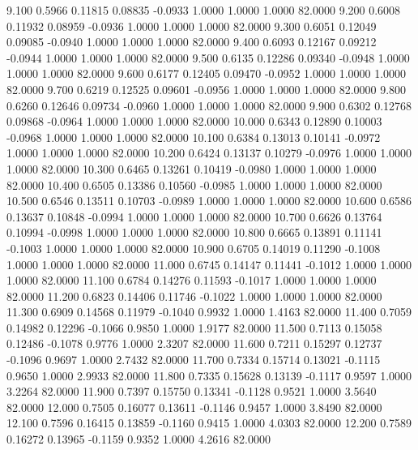    9.100   0.5966   0.11815   0.08835  -0.0933   1.0000   1.0000   1.0000  82.0000
   9.200   0.6008   0.11932   0.08959  -0.0936   1.0000   1.0000   1.0000  82.0000
   9.300   0.6051   0.12049   0.09085  -0.0940   1.0000   1.0000   1.0000  82.0000
   9.400   0.6093   0.12167   0.09212  -0.0944   1.0000   1.0000   1.0000  82.0000
   9.500   0.6135   0.12286   0.09340  -0.0948   1.0000   1.0000   1.0000  82.0000
   9.600   0.6177   0.12405   0.09470  -0.0952   1.0000   1.0000   1.0000  82.0000
   9.700   0.6219   0.12525   0.09601  -0.0956   1.0000   1.0000   1.0000  82.0000
   9.800   0.6260   0.12646   0.09734  -0.0960   1.0000   1.0000   1.0000  82.0000
   9.900   0.6302   0.12768   0.09868  -0.0964   1.0000   1.0000   1.0000  82.0000
  10.000   0.6343   0.12890   0.10003  -0.0968   1.0000   1.0000   1.0000  82.0000
  10.100   0.6384   0.13013   0.10141  -0.0972   1.0000   1.0000   1.0000  82.0000
  10.200   0.6424   0.13137   0.10279  -0.0976   1.0000   1.0000   1.0000  82.0000
  10.300   0.6465   0.13261   0.10419  -0.0980   1.0000   1.0000   1.0000  82.0000
  10.400   0.6505   0.13386   0.10560  -0.0985   1.0000   1.0000   1.0000  82.0000
  10.500   0.6546   0.13511   0.10703  -0.0989   1.0000   1.0000   1.0000  82.0000
  10.600   0.6586   0.13637   0.10848  -0.0994   1.0000   1.0000   1.0000  82.0000
  10.700   0.6626   0.13764   0.10994  -0.0998   1.0000   1.0000   1.0000  82.0000
  10.800   0.6665   0.13891   0.11141  -0.1003   1.0000   1.0000   1.0000  82.0000
  10.900   0.6705   0.14019   0.11290  -0.1008   1.0000   1.0000   1.0000  82.0000
  11.000   0.6745   0.14147   0.11441  -0.1012   1.0000   1.0000   1.0000  82.0000
  11.100   0.6784   0.14276   0.11593  -0.1017   1.0000   1.0000   1.0000  82.0000
  11.200   0.6823   0.14406   0.11746  -0.1022   1.0000   1.0000   1.0000  82.0000
  11.300   0.6909   0.14568   0.11979  -0.1040   0.9932   1.0000   1.4163  82.0000
  11.400   0.7059   0.14982   0.12296  -0.1066   0.9850   1.0000   1.9177  82.0000
  11.500   0.7113   0.15058   0.12486  -0.1078   0.9776   1.0000   2.3207  82.0000
  11.600   0.7211   0.15297   0.12737  -0.1096   0.9697   1.0000   2.7432  82.0000
  11.700   0.7334   0.15714   0.13021  -0.1115   0.9650   1.0000   2.9933  82.0000
  11.800   0.7335   0.15628   0.13139  -0.1117   0.9597   1.0000   3.2264  82.0000
  11.900   0.7397   0.15750   0.13341  -0.1128   0.9521   1.0000   3.5640  82.0000
  12.000   0.7505   0.16077   0.13611  -0.1146   0.9457   1.0000   3.8490  82.0000
  12.100   0.7596   0.16415   0.13859  -0.1160   0.9415   1.0000   4.0303  82.0000
  12.200   0.7589   0.16272   0.13965  -0.1159   0.9352   1.0000   4.2616  82.0000
